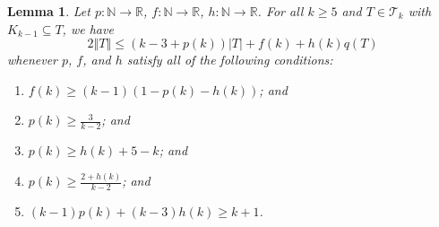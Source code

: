 \documentclass[12pt]{article}
\theoremstyle{plain}
\newtheorem{lem}[thm]{Lemma}
\theoremstyle{definition}
\theoremstyle{remark}
\newcommand{\fancy}[1]{\mathcal{#1}}
\newcommand{\IN}{\mathbb{N}}
\newcommand{\IR}{\mathbb{R}}
\newcommand{\T}{\fancy{T}}
\newcommand{\card}[1]{\left|#1\right|}
\newcommand{\size}[1]{\left\Vert#1\right\Vert}
\newcommand{\func}[3]{#1\colon #2 \rightarrow #3}
\begin{document}
\begin{lem}\label{BoundFamilyWithKKMinusOne}
	Let $\func{p}{\IN}{\IR}$, $\func{f}{\IN}{\IR}$, $\func{h}{\IN}{\IR}$. 
	For all $k \ge 5$ and $T \in \T_k$ with $K_{k-1} \subseteq T$, we have
	\[2\size{T} \le (k-3 + p(k))\card{T} + f(k) + h(k)q(T)\]
	whenever $p$, $f$, and $h$ satisfy all of the following conditions:
	\begin{enumerate}
		\item $f(k) \ge (k-1)(1- p(k) - h(k))$; and	
	    \item $p(k) \ge \frac{3}{k-2}$; and
		\item $p(k) \ge h(k) + 5 - k$; and
		\item $p(k) \ge \frac{2+h(k)}{k-2}$; and
		\item $(k-1)p(k) + (k-3)h(k) \ge k+1$.
	\end{enumerate}
	
\end{lem}
\end{document}
